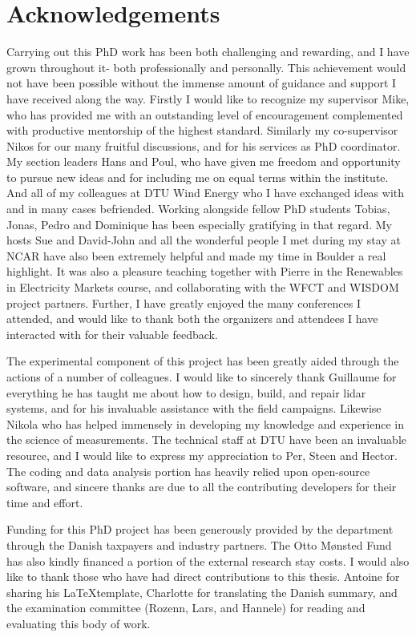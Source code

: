 \chapter{Acknowledgements}
\label{sec:acknowledgements}

Carrying out this PhD work has been both challenging and rewarding, and I have grown throughout it- both professionally and personally. This achievement would not have been possible without the immense amount of guidance and support I have received along the way. Firstly I would like to recognize my supervisor Mike, who has provided me with an outstanding level of encouragement complemented with productive mentorship of the highest standard. Similarly my co-supervisor Nikos for our many fruitful discussions, and for his services as PhD coordinator. My section leaders Hans and Poul, who have given me freedom and opportunity to pursue new ideas and for including me on equal terms within the institute. And all of my colleagues at DTU Wind Energy who I have exchanged ideas with and in many cases befriended. Working alongside fellow PhD students Tobias, Jonas, Pedro and Dominique has been especially gratifying in that regard. My hosts Sue and David-John and all the wonderful people I met during my stay at NCAR have also been extremely helpful and made my time in Boulder a real highlight. It was also a pleasure teaching together with Pierre in the Renewables in Electricity Markets course, and collaborating with the WFCT and WISDOM project partners. Further, I have greatly enjoyed the many conferences I attended, and would like to thank both the organizers and attendees I have interacted with for their valuable feedback.

The experimental component of this project has been greatly aided through the actions of a number of colleagues. I would like to sincerely thank Guillaume for everything he has taught me about how to design, build, and repair lidar systems, and for his invaluable assistance with the field campaigns. Likewise Nikola who has helped immensely in developing my knowledge and experience in the science of measurements. The technical staff at DTU have been an invaluable resource, and I would like to express my appreciation to Per, Steen and Hector. The coding and data analysis portion has heavily relied upon open-source software, and sincere thanks are due to all the contributing developers for their time and effort.

Funding for this PhD project has been generously provided by the department through the Danish taxpayers and industry partners. The Otto M{\o}nsted Fund has also kindly financed a portion of the external research stay costs. I would also like to thank those who have had direct contributions to this thesis. Antoine for sharing his \LaTeX template, Charlotte for translating the Danish summary, and the examination committee (Rozenn, Lars, and Hannele) for reading and evaluating this body of work.

